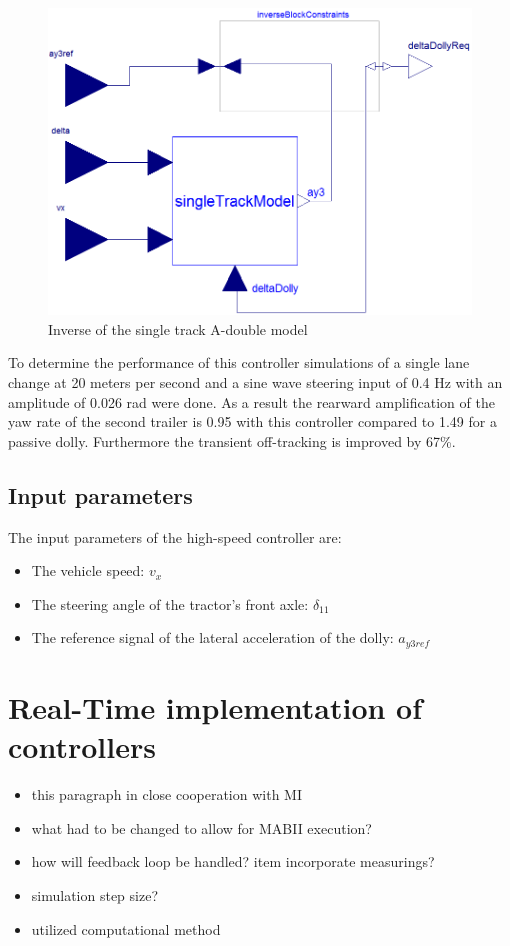 \documentclass[ExampleMasters.tex]{subfiles}
\begin{document}
\begin{figure}[h]
	\centering
	\includegraphics[width=0.5\linewidth]{figures/Inverse_of_A-double_single-track}
	\caption[]{Inverse of the single track A-double model \cite{High-speed_paper}}
	
	\label{fig:inverse_model}
\end{figure}

To determine the performance of this controller simulations of a single lane change at 20 meters per second and a sine wave steering input of 0.4 Hz with an amplitude of 0.026 rad were done. As a result the rearward amplification of the yaw rate of the second trailer is 0.95 with this controller compared to 1.49 for a passive dolly. Furthermore the transient off-tracking is improved by 67\%. 

\subsection{Input parameters}
\label{sec:input_parameters_HS}
The input parameters of the high-speed controller are:

\begin{itemize}
\item The vehicle speed: $v_x$ 
\item The steering angle of the tractor's front axle: $\delta_{11}$
\item The reference signal of the lateral acceleration of the dolly: $a_{y3ref}$
\end{itemize}

\section{Real-Time implementation of controllers}
\label{sec:real_time_implementation}

\begin{itemize}
	\item this paragraph in close cooperation with MI
	\item what had to be changed to allow for MABII execution?
	\item how will feedback loop be handled?
	item incorporate measurings?
	\item simulation step size?
	\item utilized computational method
\end{itemize}
\end{document}
